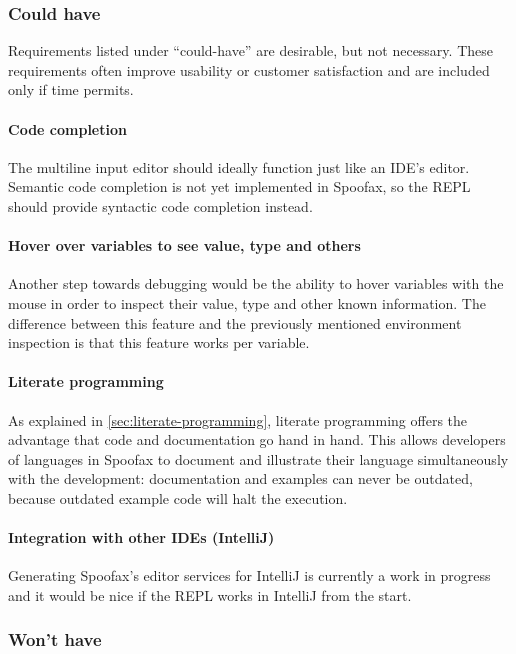 \subsubsection{Could have}

Requirements listed under ``could-have'' are desirable, but not necessary.
These requirements often improve usability or customer satisfaction and are
included only if time permits.

\paragraph{Code completion} The multiline input editor should ideally function
just like an IDE's editor. Semantic code completion is not yet implemented in
Spoofax, so the REPL should provide syntactic code completion instead.

\paragraph{Hover over variables to see value, type and others} Another step
towards debugging would be the ability to hover variables with the mouse in
order to inspect their value, type and other known information. The difference
between this feature and the previously mentioned environment inspection is that
this feature works per variable.

\paragraph{Literate programming} As explained in
\cref{sec:literate-programming}, literate programming offers the advantage that
code and documentation go hand in hand. This allows developers of languages in
Spoofax to document and illustrate their language simultaneously with the
development: documentation and examples can never be outdated, because outdated
example code will halt the execution.

\paragraph{Integration with other IDEs (IntelliJ)} Generating Spoofax's editor
services for IntelliJ is currently a work in progress and it would be nice if
the REPL works in IntelliJ from the start.

\subsubsection{Won't have}

